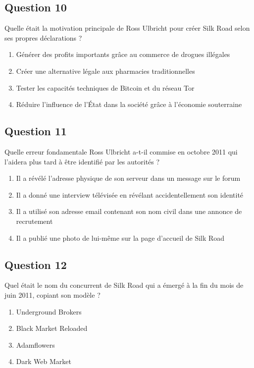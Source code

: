 \documentclass[12pt,a4paper]{article}
\begin{document}
\bigskip


\subsection*{Question 10}
Quelle était la motivation principale de Ross Ulbricht pour créer Silk Road selon ses propres déclarations ?

\begin{enumerate}[label=\Alph*., leftmargin=*]
\item Générer des profits importants grâce au commerce de drogues illégales
\item Créer une alternative légale aux pharmacies traditionnelles
\item Tester les capacités techniques de Bitcoin et du réseau Tor
\item Réduire l'influence de l'État dans la société grâce à l'économie souterraine
\end{enumerate}

\bigskip


\subsection*{Question 11}
Quelle erreur fondamentale Ross Ulbricht a-t-il commise en octobre 2011 qui l'aidera plus tard à être identifié par les autorités ?

\begin{enumerate}[label=\Alph*., leftmargin=*]
\item Il a révélé l'adresse physique de son serveur dans un message sur le forum
\item Il a donné une interview télévisée en révélant accidentellement son identité
\item Il a utilisé son adresse email contenant son nom civil dans une annonce de recrutement
\item Il a publié une photo de lui-même sur la page d'accueil de Silk Road
\end{enumerate}

\bigskip


\subsection*{Question 12}
Quel était le nom du concurrent de Silk Road qui a émergé à la fin du mois de juin 2011, copiant son modèle ?

\begin{enumerate}[label=\Alph*., leftmargin=*]
\item Underground Brokers
\item Black Market Reloaded
\item Adamflowers
\item Dark Web Market
\end{enumerate}
\end{document}
